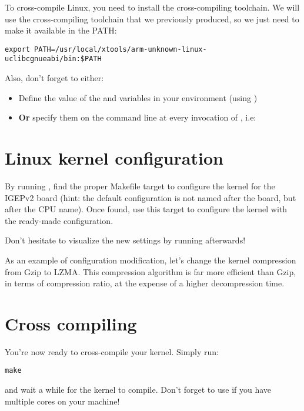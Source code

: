 To cross-compile Linux, you need to install the cross-compiling
toolchain. We will use the cross-compiling toolchain that we
previously produced, so we just need to make it available in the PATH:

\begin{verbatim}
export PATH=/usr/local/xtools/arm-unknown-linux-uclibcgnueabi/bin:$PATH
\end{verbatim}

Also, don't forget to either:

\begin{itemize}
\item Define the value of the  and 
  variables in your environment (using )
\item {\bf Or} specify them on the command line at every invocation of
  , i.e: 
\end{itemize}

\section{Linux kernel configuration}

By running , find the proper Makefile target to
configure the kernel for the IGEPv2 board (hint: the default
configuration is not named after the board, but after the CPU
name). Once found, use this target to configure the kernel with the
ready-made configuration.

Don't hesitate to visualize the new settings by running
 afterwards!

As an example of configuration modification, let's change the kernel
compression from Gzip to LZMA. This compression algorithm is far more
efficient than Gzip, in terms of compression ratio, at the expense of
a higher decompression time.

\section{Cross compiling}

You're now ready to cross-compile your kernel. Simply run:

\begin{verbatim}
make
\end{verbatim}

and wait a while for the kernel to compile. Don't forget to use
 if you have multiple cores on your machine!

